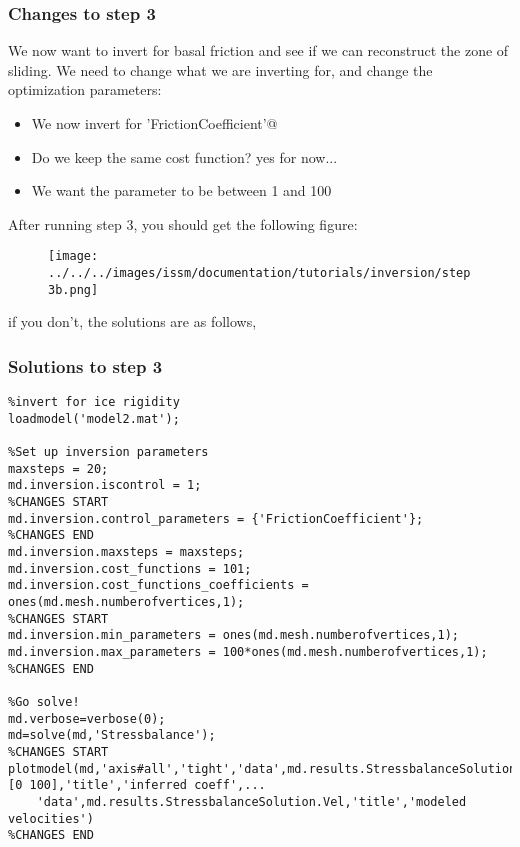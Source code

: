 \subsubsection{Changes to step 3}
We now want to invert for basal friction and see if we can reconstruct the zone of sliding. We need to change what we are inverting for, and change the optimization parameters:
\begin{itemize}
	\item We now invert for \verb@'FrictionCoefficient'@
	\item Do we keep the same cost function? yes for now...
	\item We want the parameter to be between 1 and 100
\end{itemize}
After running step 3, you should get the following figure:
\begin{figure}[H]
	\begin{center}
		\texttt{[image: ../../../images/issm/documentation/tutorials/inversion/step3b.png]}
	\end{center}
\end{figure}
if you don't, the solutions are as follows,

\subsubsection{Solutions to step 3}
\begin{verbatim}%invert for ice rigidity
loadmodel('model2.mat');

%Set up inversion parameters
maxsteps = 20;
md.inversion.iscontrol = 1;
%CHANGES START
md.inversion.control_parameters = {'FrictionCoefficient'};
%CHANGES END
md.inversion.maxsteps = maxsteps;
md.inversion.cost_functions = 101;
md.inversion.cost_functions_coefficients = ones(md.mesh.numberofvertices,1);
%CHANGES START
md.inversion.min_parameters = ones(md.mesh.numberofvertices,1);
md.inversion.max_parameters = 100*ones(md.mesh.numberofvertices,1);
%CHANGES END

%Go solve!
md.verbose=verbose(0);
md=solve(md,'Stressbalance');
%CHANGES START
plotmodel(md,'axis#all','tight','data',md.results.StressbalanceSolution.FrictionCoefficient,'caxis',[0 100],'title','inferred coeff',...
	'data',md.results.StressbalanceSolution.Vel,'title','modeled velocities')
%CHANGES END
\end{verbatim}

